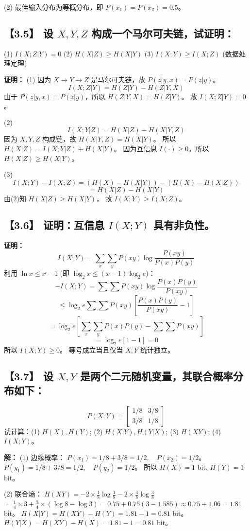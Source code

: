 \documentclass[11pt, a4paper]{article}
\begin{document}
(2) 最佳输入分布为等概分布，即 $P(x_1)=P(x_2)=0.5$。

\subsection*{【3.5】 设 $X, Y, Z$ 构成一个马尔可夫链，试证明：}
(1) $I(X; Z|Y) = 0$
(2) $H(X|Z) \ge H(X|Y)$
(3) $I(X; Y) \ge I(X; Z)$ (数据处理定理)

\textbf{证明：}
(1) 因为 $X \to Y \to Z$ 是马尔可夫链，故 $P(z|y,x) = P(z|y)$。
\[ I(X; Z|Y) = H(Z|Y) - H(Z|Y,X) \]
由于 $P(z|y,x) = P(z|y)$，所以 $H(Z|Y,X) = H(Z|Y)$。
故 $I(X; Z|Y) = 0$。

(2) 
\[ I(X; Y|Z) = H(X|Z) - H(X|Y,Z) \]
因为 $X, Y, Z$ 构成链，故 $H(X|Y,Z) = H(X|Y)$。
所以 $H(X|Z) = I(X; Y|Z) + H(X|Y)$。
因为互信息 $I(\cdot) \ge 0$，所以 $H(X|Z) \ge H(X|Y)$。

(3) 
\[ I(X; Y) - I(X; Z) = (H(X) - H(X|Y)) - (H(X) - H(X|Z)) \]
\[ = H(X|Z) - H(X|Y) \]
由(2)知 $H(X|Z) \ge H(X|Y)$，
故 $I(X; Y) \ge I(X; Z)$。

\subsection*{【3.6】 证明：互信息 $I(X;Y)$ 具有非负性。}
\textbf{证明：}
\[ I(X;Y) = \sum_x \sum_y P(xy) \log \frac{P(xy)}{P(x)P(y)} \]
利用 $\ln x \le x-1$ (即 $\log_2 x \le (x-1)\log_2 e$)：
\[ -I(X;Y) = \sum \sum P(xy) \log \frac{P(x)P(y)}{P(xy)} \]
\[ \le \log_2 e \sum \sum P(xy) [\frac{P(x)P(y)}{P(xy)} - 1] \]
\[ = \log_2 e [\sum_x \sum_y P(x)P(y) - \sum \sum P(xy)] \]
\[ = \log_2 e [1 - 1] = 0 \]
所以 $I(X;Y) \ge 0$。
等号成立当且仅当 $X, Y$ 统计独立。

\subsection*{【3.7】 设 $X, Y$ 是两个二元随机变量，其联合概率分布如下：}
\[ P(X, Y) = \begin{bmatrix} 1/8 & 3/8 \\ 3/8 & 1/8 \end{bmatrix} \]
试计算：(1) $H(X), H(Y)$; (2) $H(X|Y), H(Y|X)$; (3) $H(XY)$; (4) $I(X;Y)$。

\textbf{解：}
(1) 边缘概率：
$P(x_1) = 1/8 + 3/8 = 1/2, \quad P(x_2) = 1/2$。
$P(y_1) = 1/8 + 3/8 = 1/2, \quad P(y_2) = 1/2$。
所以 $H(X) = 1$ bit, $H(Y) = 1$ bit。

(2) 联合熵：
$H(XY) = -2 \times \frac{1}{8}\log\frac{1}{8} - 2 \times \frac{3}{8}\log\frac{3}{8}$
$= \frac{1}{4} \times 3 + \frac{3}{4} \times (\log 8 - \log 3) = 0.75 + 0.75(3 - 1.585) \approx 0.75 + 1.06 = 1.81$ bit。
$H(X|Y) = H(XY) - H(Y) = 1.81 - 1 = 0.81$ bit。
$H(Y|X) = H(XY) - H(X) = 1.81 - 1 = 0.81$ bit。
\end{document}
